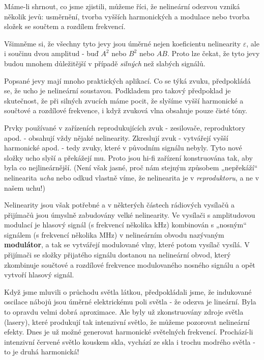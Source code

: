   Máme-li shrnout, co jsme zjistili, můžeme říci, že nelineární odezvou vzniká několik jevů: 
  usměrnění, tvorba vyšších harmonických a modulace nebo tvorba složek se součtem a rozdílem 
  frekvencí. 
  
  Všimněme si, že všechny tyto jevy jsou úměrné nejen koeficientu nelinearity \(\varepsilon\), ale 
  i součinu dvou amplitud - buď \(A^2\) nebo \(B^2\) nebo \(AB\). Proto lze čekat, že tyto jevy 
  budou mnohem důležitější v případě \emph{silných} než slabých signálů. 
  
  Popsané jevy mají mnoho praktických aplikací. Co se týká zvuku, předpokládá se, že ucho je 
  nelineární soustavou. Podkladem pro takový předpoklad je skutečnost, že při silných zvucích máme 
  pocit, že slyšíme vyšší harmonické a součtové a rozdílové frekvence, i když zvuková vlna obsahuje 
  pouze čisté tóny.
  
  Prvky používané v zařízeních reprodukujících zvuk - zesilovače, reproduktory apod. - obsahují 
  vždy nějaké nelinearity. Zkreslují zvuk - vytvářejí vyšší harmonické apod. - tedy zvuky, které v 
  původním signálu nebyly. Tyto nové složky ucho slyší a překážejí mu. Proto jsou hi-fi zařízení 
  konstruována tak, aby byla co nejlineárnější. (Není však jasné, proč nám stejným způsobem 
  „nepřekáží“ nelinearita \emph{ucha} nebo odkud vlastně víme, že nelinearita je v 
  \emph{reproduktoru}, a ne v našem uchu!)
  
  Nelinearity jsou však potřebné a v některých částech rádiových vysílačů a přijímačů jsou úmyslně 
  zabudovány velké nelinearity. Ve vysílači s amplitudovou modulací je hlasový signál (s frekvencí 
  několika kHz) kombinován s „nosným“ signálem (s frekvencí několika MHz) v nelineárním obvodu 
  nazývaným \textbf{modulátor}, a tak se vytvářejí modulované vlny, které potom vysílač vysílá. V 
  přijímači se složky přijatého signálu dostanou na nelineární obvod, který zkombinuje součtové a 
  rozdílové frekvence modulovaného nosného signálu a opět vytvoří hlasový signál.
  
  Když jsme mluvili o průchodu světla látkou, předpokládali jsme, že indukované oscilace nábojů 
  jsou úměrné elektrickému poli světla - že odezva je lineární. Byla to opravdu velmi dobrá 
  aproximace. Ale byly už zkonstruovány zdroje světla (lasery), které produkují tak intenzivní 
  světlo, že můžeme pozorovat nelineární efekty. Dnes je už možné generovat harmonické světelných 
  frekvencí. Prochází-li intenzivní červené světlo kouskem skla, vychází ze skla i trochu modrého 
  světla - to je druhá harmonická!
  

\printbibliography[title={Seznam literatury}, heading=subbibliography]
